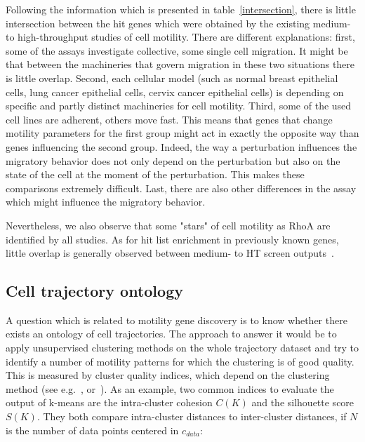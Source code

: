 Following the information which is presented in
table~\ref{intersection}, there is little intersection between the hit
genes which were obtained by the existing medium- to high-throughput
studies of cell motility. There are different explanations: first,
some of the assays investigate collective, some single cell
migration. It might be that between the machineries that govern
migration in these two situations there is little overlap. Second,
each cellular model (such
as normal breast epithelial cells, lung cancer epithelial cells,
cervix cancer epithelial cells) is depending on specific and partly
distinct machineries for cell motility. Third, some of the used cell
lines are adherent, others move fast. This means that genes that
change motility parameters for the first group might act in exactly
the opposite way than genes influencing the second group. Indeed, the
way a perturbation influences the migratory behavior does not only
depend on the perturbation but also on the state of the cell at the
moment of the perturbation. This makes these comparisons extremely
difficult. Last, there
are also other differences in the assay which might influence the
migratory behavior. 

Nevertheless, we also observe that some "stars" of cell motility as
RhoA are identified by all studies. As for hit list enrichment in
previously known genes, little overlap is generally observed between
medium- to HT screen outputs~\cite{pmid20360735}. 


\subsection{Cell trajectory ontology}
\label{sec:ontology}
A question which is related to motility gene discovery is to know
whether there exists an ontology of cell trajectories. The approach to
answer it would be to apply unsupervised clustering methods on the
whole trajectory dataset and try to identify a number of motility
patterns for which the clustering is of good quality. This is measured
by cluster quality indices, which depend on the clustering method (see
e.g.~\cite[Chapter~8]{Tan:2005:IDM:1095618}, or~\cite{Halkidi}). As an
example, two common indices to evaluate the output of k-means are the
intra-cluster cohesion $C(K)$ and the silhouette score $S(K)$. They
both compare intra-cluster distances to inter-cluster distances, if
$N$ is the number of data points centered in $c_{data}$:

